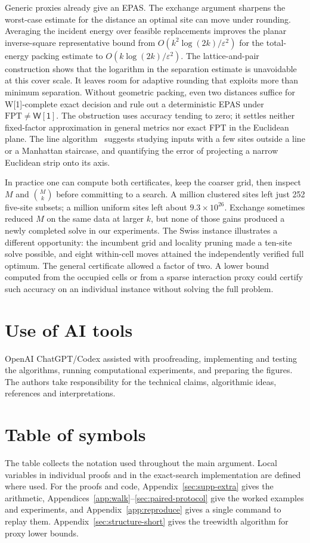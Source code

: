 \documentclass[a4paper,12pt]{article}
\numberwithin{equation}{section}
\begin{document}
Generic proxies already give an EPAS. The exchange argument sharpens the worst-case estimate
for the distance an optimal site can move under rounding. Averaging the incident energy over feasible replacements improves the planar inverse-square representative bound from
$O(k^2\log(2k)/\varepsilon^2)$ for the total-energy packing estimate to
$O(k\log(2k)/\varepsilon^2)$. The lattice-and-pair construction shows that the logarithm in
the separation estimate is unavoidable at this cover scale. It leaves room for adaptive
rounding that exploits more than minimum separation. Without geometric packing, even two
distances suffice for W[1]-complete exact decision and rule out a deterministic EPAS under
$\mathrm{FPT}\ne\mathsf{W[1]}$. The obstruction uses accuracy tending to zero; it settles neither
fixed-factor approximation in general metrics nor exact FPT in the Euclidean plane.
The line algorithm~\cite{line2026} suggests studying inputs with a few sites outside a line or a Manhattan staircase, and quantifying the error of projecting a narrow Euclidean strip onto its axis.

In practice one can compute both certificates, keep the coarser grid, then inspect $M$ and
$\binom Mk$ before committing to a search. A million clustered sites left just 252 five-site
subsets; a million uniform sites left about $9.3\times10^{26}$. Exchange sometimes reduced $M$
on the same data at larger $k$, but none of those gains produced a newly completed solve in our
experiments. The Swiss instance illustrates a different opportunity: the incumbent grid and
locality pruning made a ten-site solve possible, and eight within-cell moves attained the
independently verified full optimum. The general certificate allowed a factor of two.
A lower bound computed from the occupied cells or from a sparse interaction proxy could certify
such accuracy on an individual instance without solving the full problem.

\section*{Use of AI tools}
OpenAI ChatGPT/Codex assisted with proofreading, implementing and testing the algorithms,
running computational experiments, and preparing the figures. The authors take responsibility
for the technical claims, algorithmic ideas, references and interpretations.

\clearpage
\appendix
{}

\section{Table of symbols}\label{app:symbols}
The table collects the notation used throughout the main argument. Local variables
in individual proofs and in the exact-search implementation are defined where used.
For the proofs and code, Appendix~\ref{sec:supp-extra} gives the arithmetic,
Appendices~\ref{app:walk}--\ref{sec:paired-protocol} give the worked examples
and experiments, and Appendix~\ref{app:reproduce} gives a single command
to replay them. Appendix~\ref{sec:structure-short} gives the treewidth algorithm for proxy lower bounds.
\end{document}
